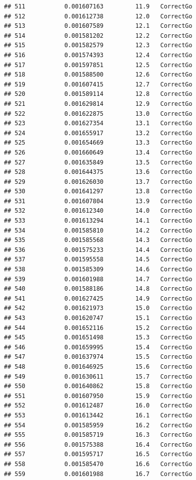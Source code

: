 \documentclass[
]{article}
\begin{document}
\begin{verbatim}
## 511           0.001607163         11.9   CorrectGo
## 512           0.001612738         12.0   CorrectGo
## 513           0.001607589         12.1   CorrectGo
## 514           0.001581202         12.2   CorrectGo
## 515           0.001582579         12.3   CorrectGo
## 516           0.001574393         12.4   CorrectGo
## 517           0.001597851         12.5   CorrectGo
## 518           0.001588500         12.6   CorrectGo
## 519           0.001607415         12.7   CorrectGo
## 520           0.001589114         12.8   CorrectGo
## 521           0.001629814         12.9   CorrectGo
## 522           0.001622875         13.0   CorrectGo
## 523           0.001627354         13.1   CorrectGo
## 524           0.001655917         13.2   CorrectGo
## 525           0.001654669         13.3   CorrectGo
## 526           0.001660649         13.4   CorrectGo
## 527           0.001635849         13.5   CorrectGo
## 528           0.001644375         13.6   CorrectGo
## 529           0.001626030         13.7   CorrectGo
## 530           0.001641297         13.8   CorrectGo
## 531           0.001607804         13.9   CorrectGo
## 532           0.001612340         14.0   CorrectGo
## 533           0.001613294         14.1   CorrectGo
## 534           0.001585810         14.2   CorrectGo
## 535           0.001585568         14.3   CorrectGo
## 536           0.001575233         14.4   CorrectGo
## 537           0.001595558         14.5   CorrectGo
## 538           0.001585309         14.6   CorrectGo
## 539           0.001601988         14.7   CorrectGo
## 540           0.001588186         14.8   CorrectGo
## 541           0.001627425         14.9   CorrectGo
## 542           0.001621973         15.0   CorrectGo
## 543           0.001620747         15.1   CorrectGo
## 544           0.001652116         15.2   CorrectGo
## 545           0.001651498         15.3   CorrectGo
## 546           0.001659995         15.4   CorrectGo
## 547           0.001637974         15.5   CorrectGo
## 548           0.001646925         15.6   CorrectGo
## 549           0.001630611         15.7   CorrectGo
## 550           0.001640862         15.8   CorrectGo
## 551           0.001607950         15.9   CorrectGo
## 552           0.001612487         16.0   CorrectGo
## 553           0.001613442         16.1   CorrectGo
## 554           0.001585959         16.2   CorrectGo
## 555           0.001585719         16.3   CorrectGo
## 556           0.001575388         16.4   CorrectGo
## 557           0.001595717         16.5   CorrectGo
## 558           0.001585470         16.6   CorrectGo
## 559           0.001601988         16.7   CorrectGo

\end{verbatim}
\end{document}
